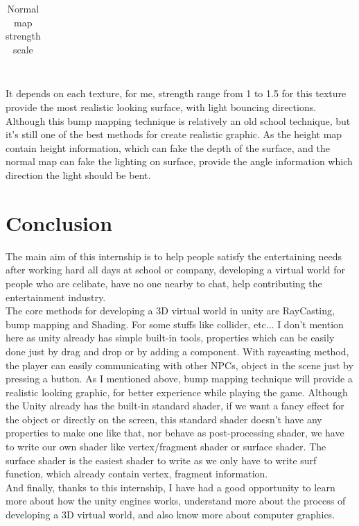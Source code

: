 \documentclass[a4paper, 13pt]{extarticle}
\begin{document}
{\begin{table}[h]
\begin{tabular}{|M{2.5cm}|M{4cm}|M{4cm}|}
 		\end{tabular}
 		\newline\newline
 		\caption{Normal map strength scale}\label{tab1}
 	\end{table} \\
 	It depends on each texture, for me, strength range from 1 to 1.5 for this texture provide the most realistic looking surface, with light bouncing directions. Although this bump mapping technique is relatively an old school technique, but it's still one of the best methods for create realistic graphic. As the height map contain height information, which can fake the depth of the surface, and the normal map can fake the lighting on surface, provide the angle information which direction the light should be bent. 
 	 
 	\section{Conclusion}  
 	The main aim of this internship is to help people satisfy the entertaining needs after working hard all days at school or company, developing a virtual world for people who are celibate, have no one nearby to chat, help contributing the entertainment industry. \\ The core methods for developing a 3D virtual world in unity are RayCasting, bump mapping and Shading. For some stuffs like collider, etc... I don't mention here as unity already has simple built-in tools, properties which can be easily done just by drag and drop or by adding a component. With raycasting method, the player can easily communicating with other NPCs, object in the scene just by pressing a button. As I mentioned above, bump mapping technique will provide a realistic looking graphic, for better experience while playing the game. Although the Unity already has the built-in standard shader, if we want a fancy effect for the object or directly on the screen, this standard shader doesn't have any properties to make one like that, nor behave as post-processing shader, we have to write our own shader like vertex/fragment shader or surface shader. The surface shader is the easiest shader to write as we only have to write surf function, which already contain vertex, fragment information. \\ And finally, thanks to this internship, I have had a good opportunity to learn more about how the unity engines works, understand more about the process of developing a 3D virtual world, and also know more about computer graphics.   
}
\end{document}
